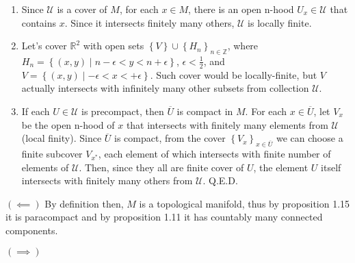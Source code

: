 \documentclass[a4paper]{article}
\begin{document}
\begin{exercise}[1-4]
\begin{enumerate}[label=(\alph*)]
    \item Since $\mathcal{U}$ is a cover of $M$, for each $x\in M$, there is an
        open n-hood $U_x \in \mathcal{U}$ that contains $x$. Since it intersects
        finitely many others, $\mathcal{U}$ is locally finite.
    \item Let's cover $\mathbb{R}^2$ with open sets
        $\left\{ V \right\} \cup \left\{ H_n \right\}_{n\in \mathbb{Z}}$, where
        $H_n = \left\{ (x, y) \mid n - \epsilon < y < n + \epsilon \right\}$,
        $\epsilon < \frac{1}{2}$, and
        $V = \left\{ (x, y) \mid - \epsilon < x < + \epsilon \right\}$.
        Such cover would be locally-finite, but $V$ actually intersects with
        infinitely many other subsets from collection $\mathcal{U}$.
    \item If each $U \in \mathcal{U}$ is precompact, then $\overline{U}$ is
        compact in $M$. For each $x \in \overline{U}$, let $V_x$ be the open
        n-hood of $x$ that intersects with finitely many elements from
        $\mathcal{U}$ (local finity). Since $\overline{U}$ is compact, from the
        cover $\left\{ V_x \right\}_{x \in \overline{U}}$ we can choose a finite
        subcover $V_{x^*}$, each element of which intersects with finite number
        of elements of $\mathcal{U}$. Then, since they all are finite cover of
        $U$, the element $U$ itself intersects with finitely many others from
        $\mathcal{U}$. Q.E.D.
\end{enumerate}
\end{exercise}

\begin{exercise}[1-5]
    $(\impliedby)$ By definition then, $M$ is a topological manifold, thus
    by proposition 1.15 it is paracompact and by proposition 1.11 it has
    countably many connected components.

    $(\implies)$
\end{exercise}
\end{document}
